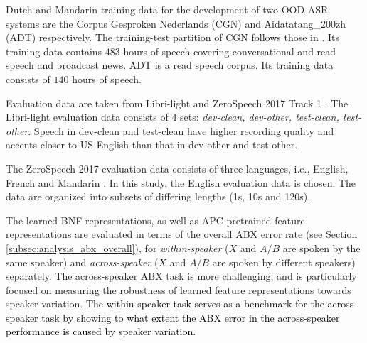 \documentclass[transmag]{IEEEtran}
\begin{document}
Dutch and Mandarin training data for the development of two OOD ASR systems are the Corpus Gesproken Nederlands (CGN) \cite{oostdijk2000spoken} and Aidatatang\_200zh (ADT) \cite{aidatatang} respectively. The training-test partition of CGN follows those in \cite{laurensw75cgn_kaldi}. Its training data contains $483$ hours of speech covering conversational and read speech and broadcast news. ADT is a read speech corpus. Its training data consists of $140$ hours of speech.

Evaluation data are taken from Libri-light and ZeroSpeech 2017 Track 1 \cite{dunbar2017zero}. The Libri-light evaluation data consists of $4$ sets: \textit{dev-clean, dev-other, test-clean, test-other}. Speech in dev-clean and test-clean have higher recording quality and accents closer to US English than that in dev-other and test-other.

The ZeroSpeech 2017 evaluation data consists of three languages, i.e., English, French and Mandarin \cite{dunbar2017zero}. In this study, the English evaluation data is chosen. The data are organized into subsets of differing lengths (1s, 10s and 120s). 

The learned BNF representations, as well as APC pretrained feature representations are evaluated in terms of the overall ABX error rate (see Section \ref{subsec:analysis_abx_overall}), for \textit{within-speaker} ($X$ and $A/B$ are spoken by the same speaker) and \textit{across-speaker} ($X$ and $A/B$ are spoken by different speakers) separately. The across-speaker ABX task is more challenging, and is particularly focused on measuring the robustness of learned feature representations towards speaker variation. \textcolor{black}{The within-speaker task serves as a benchmark for the across-speaker task by showing to what extent the ABX error in the across-speaker performance is caused by speaker variation.}
\end{document}
